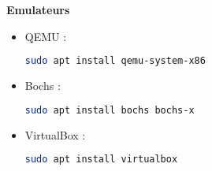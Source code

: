 \documentclass{article}
\begin{document}
\textbf{Emulateurs}
\begin{itemize}
    \item QEMU :
    \begin{lstlisting}[language=bash]
    sudo apt install qemu-system-x86
    \end{lstlisting}
    
    \item Bochs :
    \begin{lstlisting}[language=bash]
    sudo apt install bochs bochs-x
    \end{lstlisting}
    
    \item VirtualBox :
    \begin{lstlisting}[language=bash]
    sudo apt install virtualbox
    \end{lstlisting}
\end{itemize}
\end{document}
